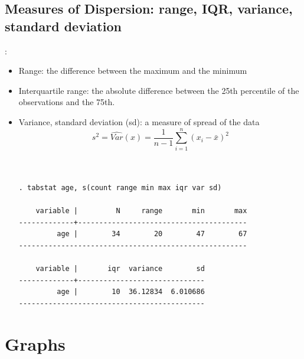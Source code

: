 \subsection{Measures of Dispersion: range, IQR, variance, standard deviation}
\begin{frame}[fragile]{{\secname: \subsecname}}	
\begin{itemize}
	\item Range: the difference between the maximum and the minimum 
	\item Interquartile range: the absolute difference between the 25th percentile of the observations and the 75th.
	\item Variance, standard deviation (sd): a measure of spread of the data
\footnotesize
	\begin{displaymath}
s^{2} = \widehat{Var}(x)=\frac{1}{n-1} \sum_{i=1}^{n}\left(x_{i}-\bar{x}\right)^{2}
\end{displaymath}

\scriptsize
\begin{verbatim}


. tabstat age, s(count range min max iqr var sd)

    variable |         N     range       min       max
-------------+----------------------------------------
         age |        34        20        47        67
------------------------------------------------------

    variable |       iqr  variance        sd
-------------+------------------------------
         age |        10  36.12834  6.010686
--------------------------------------------
\end{verbatim}

\end{itemize}
\end{frame}

\section{Graphs}
